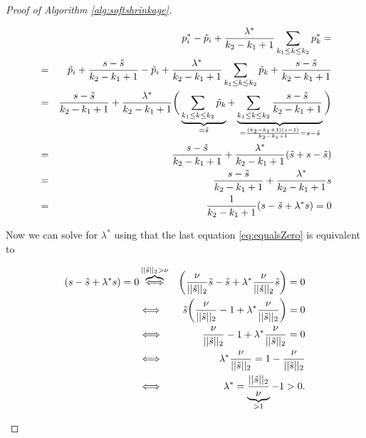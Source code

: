 \begin{proof}[Proof of Algorithm \ref{alg:softshrinkage}]
\begin{enumerate}
                \begin{eqnarray}
                    &&p^{\ast}_{i} - \tilde{p}_{i} + \frac{\lambda^{\ast}}{k_{2} - k_{1} + 1} \sum_{k_{1} \le k \le k_{2}} p^{\ast}_{k} = \notag \\
                    &=& \tilde{p}_{i} + \frac{s - \tilde{s}}{k_{2} - k_{1} + 1} - \tilde{p}_{i} + \frac{\lambda^{\ast}}{k_{2} - k_{1} + 1} \sum_{k_{1} \le k \le k_{2}} \tilde{p}_{k} + \frac{s - \tilde{s}}{k_{2} - k_{1} + 1} \notag \\
                    &=& \frac{s - \tilde{s}}{k_{2} - k_{1} + 1} + \frac{\lambda^{\ast}}{k_{2} - k_{1} + 1} \bigg( \underbrace{\sum_{k_{1} \le k \le k_{2}} \tilde{p}_{k}}_{= \tilde{s}} + \underbrace{\sum_{k_{1} \le k \le k_{2}} \frac{s - \tilde{s}}{k_{2} - k_{1} + 1}}_{= \frac{(k_{2} - k_{1} + 1) (s - \tilde{s})}{k_{2} - k_{1} + 1} = s - \tilde{s}} \bigg) \notag \\
                    &=& \frac{s - \tilde{s}}{k_{2} - k_{1} + 1} + \frac{\lambda^{\ast}}{k_{2} - k_{1} + 1} (\tilde{s} + s - \tilde{s}) \notag \\
                    &=& \frac{s - \tilde{s}}{k_{2} - k_{1} + 1} + \frac{\lambda^{\ast}}{k_{2} - k_{1} + 1}s \notag \\
                    &=& \frac{1}{k_{2} - k_{1} + 1} (s - \tilde{s} + \lambda^{\ast}s) = 0 \label{eq:equalsZero}
                \end{eqnarray}

            Now we can solve for $\lambda^{\ast}$ using that the last equation \ref{eq:equalsZero} is equivalent to

                \begin{eqnarray}
                    (s - \tilde{s} + \lambda^{\ast} s) = 0 &\overbrace{\Longleftrightarrow}^{||\tilde{s}||_{2} > \nu}& \bigg(\frac{\nu}{||\tilde{s}||_{2}}\tilde{s} - \tilde{s} + \lambda^{\ast} \frac{\nu}{||\tilde{s}||_{2}}\tilde{s} \bigg) = 0 \notag \\
                    &\Longleftrightarrow& \tilde{s} \bigg( \frac{\nu}{||\tilde{s}||_{2}} - 1 + \lambda^{\ast} \frac{\nu}{||\tilde{s}||_{2}} \bigg) = 0 \notag \\
                    &\Longleftrightarrow& \frac{\nu}{||\tilde{s}||_{2}} - 1 + \lambda^{\ast} \frac{\nu}{||\tilde{s}||_{2}} = 0 \notag \\
                    &\Longleftrightarrow& \lambda^{\ast} \frac{\nu}{||\tilde{s}||_{2}} = 1 - \frac{\nu}{||\tilde{s}||_{2}} \notag \\
                    &\Longleftrightarrow& \lambda^{\ast} = \underbrace{\frac{||\tilde{s}||_{2}}{\nu}}_{> 1} - 1 > 0. \notag
                \end{eqnarray}


\end{enumerate}
\end{proof}
